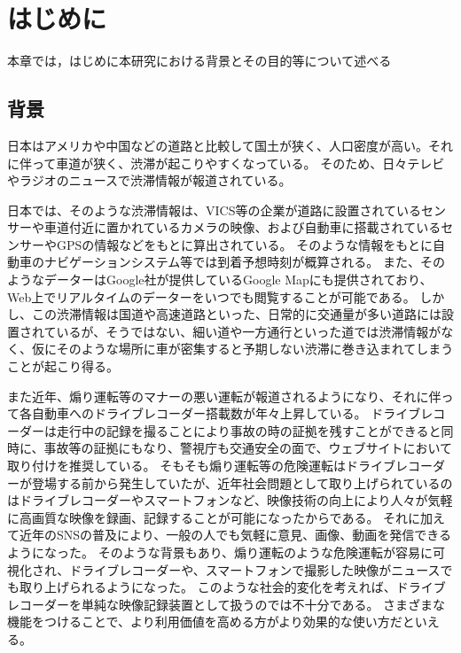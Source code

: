 \chapter{はじめに}
本章では，はじめに本研究における背景とその目的等について述べる
\section{背景}
日本はアメリカや中国などの道路と比較して国土が狭く、人口密度が高い。それに伴って車道が狭く、渋滞が起こりやすくなっている。
そのため、日々テレビやラジオのニュースで渋滞情報が報道されている。


日本では、そのような渋滞情報は、VICS等の企業が道路に設置されているセンサーや車道付近に置かれているカメラの映像、および自動車に搭載されているセンサーやGPSの情報などをもとに算出されている。
そのような情報をもとに自動車のナビゲーションシステム等では到着予想時刻が概算される。
また、そのようなデーターはGoogle社が提供しているGoogle Mapにも提供されており、Web上でリアルタイムのデーターをいつでも閲覧することが可能である。
しかし、この渋滞情報は国道や高速道路といった、日常的に交通量が多い道路には設置されているが、そうではない、細い道や一方通行といった道では渋滞情報がなく、仮にそのような場所に車が密集すると予期しない渋滞に巻き込まれてしまうことが起こり得る。

また近年、煽り運転等のマナーの悪い運転が報道されるようになり、それに伴って各自動車へのドライブレコーダー搭載数が年々上昇している。
ドライブレコーダーは走行中の記録を撮ることにより事故の時の証拠を残すことができると同時に、事故等の証拠にもなり、警視庁も交通安全の面で、ウェブサイトにおいて取り付けを推奨している。
そもそも煽り運転等の危険運転はドライブレコーダーが登場する前から発生していたが、近年社会問題として取り上げられているのはドライブレコーダーやスマートフォンなど、映像技術の向上により人々が気軽に高画質な映像を録画、記録することが可能になったからである。
それに加えて近年のSNSの普及により、一般の人でも気軽に意見、画像、動画を発信できるようになった。
そのような背景もあり、煽り運転のような危険運転が容易に可視化され、ドライブレコーダーや、スマートフォンで撮影した映像がニュースでも取り上げられるようになった。
このような社会的変化を考えれば、ドライブレコーダーを単純な映像記録装置として扱うのでは不十分である。
さまざまな機能をつけることで、より利用価値を高める方がより効果的な使い方だといえる。

